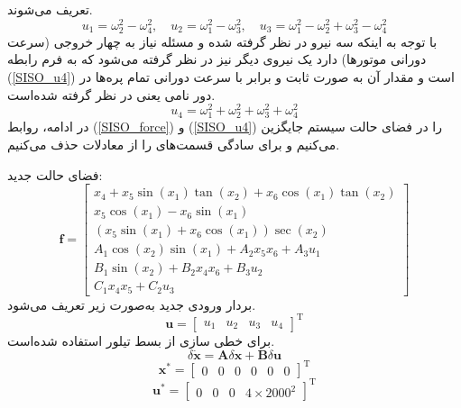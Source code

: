 تعریف می‌شوند.
\begin{equation}\label{SISO_force}
	u_1 = \omega_2^2 - \omega_4^2, \quad
	u_2 = \omega_1^2 - \omega_3^2, \quad
	u_3 = \omega_1^2 - \omega_2^2  + \omega_3^2 - \omega_4^2
\end{equation}
با توجه به اینکه سه نیرو در نظر گرفته ‌شده و مسئله نیاز به چهار خروجی (سرعت دورانی موتورها) دارد یک نیروی دیگر نیز در نظر گرفته ‌می‌شود که به فرم رابطه 
(\ref{SISO_u4})
است و مقدار آن به صورت ثابت و برابر با سرعت دورانی تمام پره‌ها در دور نامی یعنی
در نظر گرفته ‌شده‌‌است.
\begin{equation}\label{SISO_u4}
	u_4 = \omega_1^2 + \omega_2^2  + \omega_3^2 + \omega_4^2
\end{equation}
در ادامه، روابط 
(\ref{SISO_force})
و
(\ref{SISO_u4})
را در فضای حالت سیستم جایگزین می‌کنیم و برای سادگی قسمت‌های 
را از معادلات حذف می‌کنیم.

فضای حالت جدید:
\begin{equation}
	\boldsymbol f = \begin{bmatrix}
		x_4 + x_5\sin(x_1)\tan(x_2) + x_6\cos(x_1)\tan(x_2)\\
		x_5\cos(x_1)- x_6\sin(x_1)\\
		(x_5\sin(x_1) + x_6\cos(x_1))\sec(x_2)\\
		A_1\cos(x_2)\sin(x_1) + 
		A_2x_5x_6 + A_3u_1
		\\
		B_1\sin(x_2) + 
		B_2x_4x_6 + B_3u_2\\
		C_1x_4x_5 + 
		C_2u_3
	\end{bmatrix}
\end{equation} 
بردار ورودی جدید به‌صورت زیر تعریف می‌شود.
\begin{equation}
	\boldsymbol{u} = \begin{bmatrix}
		u_1&u_2&u_3&u_4
	\end{bmatrix}^\mathrm{T}
\end{equation}
برای خطی سازی از بسط تیلور استفاده شده‌است.
\begin{equation}
	\delta \dot{\boldsymbol{x}} = \boldsymbol{A}\delta \boldsymbol x + \boldsymbol{B}\delta \boldsymbol u 
\end{equation}
\begin{equation}
	\boldsymbol{x^*} = \begin{bmatrix} %
		0& 0 & 0 & 0& 0& 0
	\end{bmatrix}^\mathrm{T}
\end{equation}
\begin{equation}
	\boldsymbol{u^*} = \begin{bmatrix}
		0&0&0&4\times2000^2
	\end{bmatrix}^\mathrm{T}
\end{equation}

